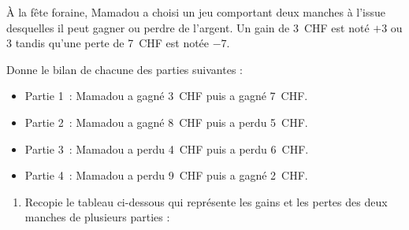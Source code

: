 \begin{activite}

À la fête foraine, Mamadou a choisi un jeu comportant deux manches à l'issue desquelles il peut gagner ou perdre de l'argent. Un gain de 3 CHF est noté $+ 3$ ou 3 tandis qu'une perte de 7 CHF est notée $- 7$.
\begin{partie}
Donne le bilan de chacune des parties suivantes :
\begin{itemize}
\item Partie 1 : Mamadou a gagné 3 CHF puis a gagné 7 CHF.
\item Partie 2 : Mamadou a gagné 8 CHF puis a perdu 5 CHF.
\item Partie 3 : Mamadou a perdu 4 CHF puis a perdu 6 CHF.
\item Partie 4 : Mamadou a perdu 9 CHF puis a gagné 2 CHF.
\end{itemize}
\end{partie}

\begin{partie}
\begin{enumerate}
 \item Recopie le tableau ci-dessous qui représente les gains et les pertes des deux manches de plusieurs parties :
 

\end{enumerate}
\end{partie}
\end{activite}
